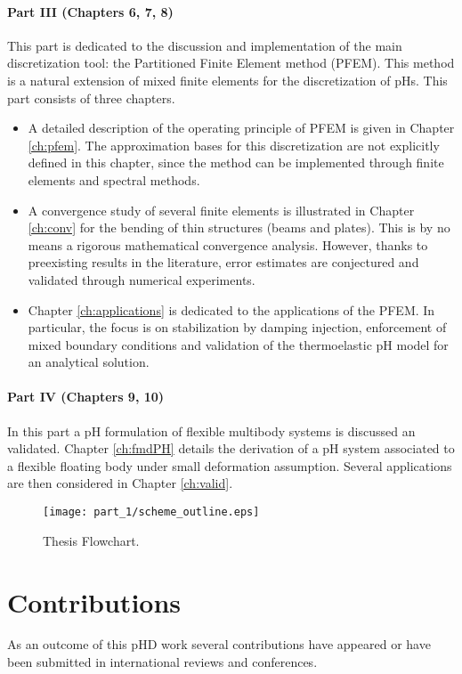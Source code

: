 \paragraph{Part III (Chapters 6, 7, 8)} This part is dedicated to the discussion and implementation of the main discretization tool: the Partitioned Finite Element method (PFEM). This method is a natural extension of mixed finite elements for the discretization of pHs. This part consists of three chapters.
\begin{itemize}
	\item A detailed description of the operating principle of PFEM is given in Chapter \ref{ch:pfem}. The approximation bases for this discretization are not explicitly defined in this chapter, since the method can be implemented through finite elements and spectral methods.
	\item A convergence study of several finite elements is illustrated in Chapter \ref{ch:conv} for the bending of thin structures (beams and plates). This is by no means a rigorous mathematical convergence analysis. However, thanks to preexisting results in the literature, error estimates are conjectured and validated through numerical experiments.
	\item Chapter \ref{ch:applications} is dedicated to the applications of the PFEM. In particular, the focus is on stabilization by damping injection, enforcement of mixed boundary conditions and validation of the thermoelastic pH model for an analytical solution.
\end{itemize}
 
\paragraph{Part IV (Chapters 9, 10)} In this part a pH formulation of flexible multibody systems is discussed an validated. Chapter \ref{ch:fmdPH} details the derivation of a pH system associated to a flexible floating body under small deformation assumption. Several applications are then considered in Chapter \ref{ch:valid}.


\begin{sidewaysfigure}
	\centering
	\texttt{[image: part\_1/scheme\_outline.eps]}%
	\caption[]{Thesis Flowchart.}%
	\label{fig:flowchart}%
\end{sidewaysfigure}

\section{Contributions}
As an outcome of this pHD work several contributions have appeared or have been submitted in international reviews and conferences. \\

